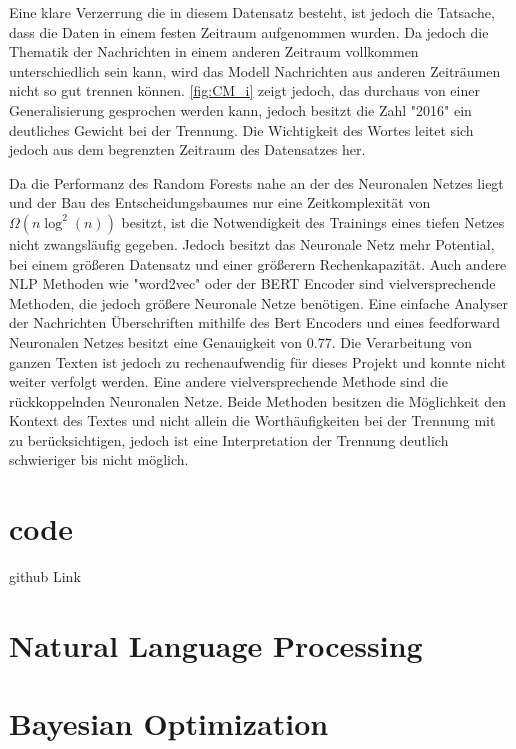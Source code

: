 Eine klare Verzerrung die in diesem Datensatz besteht, ist jedoch die Tatsache, dass die Daten in einem festen 
Zeitraum aufgenommen wurden.
Da jedoch die Thematik der Nachrichten in einem anderen Zeitraum vollkommen unterschiedlich sein kann, wird das 
Modell Nachrichten aus anderen Zeiträumen nicht so gut trennen können.
\ref{fig:CM_i} zeigt jedoch, das durchaus von einer Generalisierung gesprochen werden kann, jedoch besitzt die 
Zahl "2016" ein deutliches Gewicht bei der Trennung.
Die Wichtigkeit des Wortes leitet sich jedoch aus dem begrenzten Zeitraum des Datensatzes her.

Da die Performanz des Random Forests nahe an der des Neuronalen Netzes liegt und der Bau des Entscheidungsbaumes 
nur eine Zeitkomplexität von $\Omega(n \log^2 (n))$\cite[96]{understanding_RF} besitzt, ist die Notwendigkeit des 
Trainings eines tiefen Netzes nicht zwangsläufig gegeben.
Jedoch besitzt das Neuronale Netz mehr Potential, bei einem größeren Datensatz und einer größerern Rechenkapazität.
Auch andere NLP Methoden wie "word2vec" oder der BERT Encoder\cite{bert} sind vielversprechende Methoden, die jedoch 
größere Neuronale Netze benötigen. 
Eine einfache Analyser der Nachrichten Überschriften mithilfe des Bert Encoders und eines feedforward Neuronalen 
Netzes besitzt eine Genauigkeit von $0.77$. 
Die Verarbeitung von ganzen Texten ist jedoch zu rechenaufwendig für dieses Projekt und konnte nicht weiter 
verfolgt werden.
Eine andere vielversprechende Methode sind die rückkoppelnden Neuronalen Netze.
Beide Methoden besitzen die Möglichkeit den Kontext des Textes und nicht allein die Worthäufigkeiten bei der 
Trennung mit zu berücksichtigen, jedoch ist eine Interpretation der Trennung deutlich schwieriger bis nicht möglich.




\chapter{code}
github Link

\appendix
\chapter{Natural Language Processing}
\label{sec:NLP}

\chapter{Bayesian Optimization}
\label{sec:TPE}
